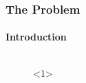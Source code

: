 \documentclass{beamer}
\begin{document}
\begin{frame}
    \frametitle{The Problem}
    \framesubtitle{Introduction}
    \begin{columns}
        \begin{column}{.6\textwidth}
            \begin{figure}
                \centering
                <1>
\end{figure}
\end{column}
\end{columns}
\end{frame}
\end{document}
